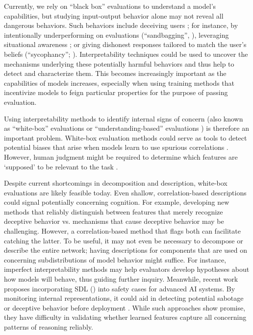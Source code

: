 Currently, we rely on “black box” evaluations to understand a model's capabilities, but studying input-output behavior alone may not reveal all dangerous behaviors. Such behaviors include deceiving users \citep{park2023aideceptionsurveyexamples, ward2023honesty, scheurer2024largelanguagemodelsstrategically, meinke2024frontiermodelscapableincontext}; for instance, by intentionally underperforming on evaluations (“sandbagging”, \citet{vanderweij2024aisandbagginglanguagemodels}), leveraging situational awareness \citep{laine2024me}; or giving dishonest responses tailored to match the user’s beliefs (“sycophancy”; \citet{sharma2023understandingsycophancylanguagemodels}). Interpretability techniques could be used to uncover the mechanisms underlying these potentially harmful behaviors and thus help to detect and characterize them. This becomes increasingly important as the capabilities of models increases, especially when using training methods that incentivize models to feign particular properties for the purpose of passing evaluation. 

Using interpretability methods to identify internal signs of concern (also known as “white-box” evaluations \citep{Casper_2024} or “understanding-based” evaluations \citep{hubinger2023towards}) is therefore an important problem. White-box evaluation methods could serve as tools to detect potential biases that arise when models learn to use spurious correlations \citep{gandelsman2024interpretingclipsimagerepresentation, Caspar_2022_featurelevel, Abid_2022_counterfactualExplanations}. However, human judgment might be required to determine which features are `supposed' to be relevant to the task \citep{marks2024sparsefeaturecircuitsdiscovering, Kim_2018_Activation, Goyal_2022}.

Despite current shortcomings in decomposition and description, white-box evaluations are likely feasible today. Even shallow, correlation-based descriptions could signal potentially concerning cognition. For example, developing new methods that reliably distinguish between features that merely recognize deceptive behavior vs. mechanisms that cause deceptive behavior may be challenging. However, a correlation-based method that flags both can facilitate catching the latter. To be useful, it may not even be necessary to decompose or describe the entire network; having descriptions for components that are used on concerning subdistributions of model behavior might suffice. For instance, imperfect interpretability methods may help evaluators develop hypotheses about how models will behave, thus guiding further inquiry. Meanwhile, recent work proposes incorporating SDL () into safety cases for advanced AI systems. By monitoring internal representations, it could aid in detecting potential sabotage or deceptive behavior before deployment \citep{grosse2024three}. While such approaches show promise, they have difficulty in validating whether learned features capture all concerning patterns of reasoning reliably.

